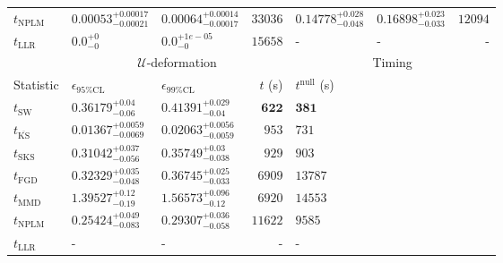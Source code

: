 \begin{tabular}{l|llr|llr}
\rowcolor{red!35}	$t_{\mathrm{NPLM}}$ & $0.00053_{-0.00021}^{+0.00017}$ & $0.00064_{-0.00017}^{+0.00014}$ & $33036$ & $0.14778_{-0.048}^{+0.028}$ & $0.16898_{-0.033}^{+0.023}$ & $12094$ \\
	$t_{\mathrm{LLR}}$ & $0.0_{-0}^{+0}$ & $0.0_{-0}^{+1e-05}$ & $15658$ & - & - & - \\
	\toprule
	\multicolumn{1}{c}{} & \multicolumn{3}{c}{$\mathcal{U}$-deformation} & \multicolumn{3}{c}{Timing} \\
	Statistic & $\epsilon_{95\%\mathrm{CL}}$ & $\epsilon_{99\%\mathrm{CL}}$ & $t$ (s) & $t^{\mathrm{null}}$ (s) \\
	\midrule
	$t_{\mathrm{SW}}$ & $0.36179_{-0.06}^{+0.04}$ & $0.41391_{-0.04}^{+0.029}$ & ${\mathbf{622}}$ & ${\mathbf{381}}$ \\
	$t_{\overline{\mathrm{KS}}}$ & ${\mathbf{0.01367_{-0.0069}^{+0.0059}}}$ & ${\mathbf{0.02063_{-0.0059}^{+0.0056}}}$ & $953$ & $731$ \\
	$t_{\mathrm{SKS}}$ & $0.31042_{-0.056}^{+0.037}$ & $0.35749_{-0.038}^{+0.03}$ & $929$ & $903$ \\
	$t_{\mathrm{FGD}}$ & $0.32329_{-0.048}^{+0.035}$ & $0.36745_{-0.033}^{+0.025}$ & $6909$ & $13787$ \\
	$t_{\mathrm{MMD}}$ & $1.39527_{-0.19}^{+0.12}$ & $1.56573_{-0.12}^{+0.096}$ & $6920$ & $14553$ \\
\rowcolor{red!35}	$t_{\mathrm{NPLM}}$ & $0.25424_{-0.083}^{+0.049}$ & $0.29307_{-0.058}^{+0.036}$ & $11622$ & $9585$ \\
	$t_{\mathrm{LLR}}$ & - & - & - & - \\
	\bottomrule
\end{tabular}